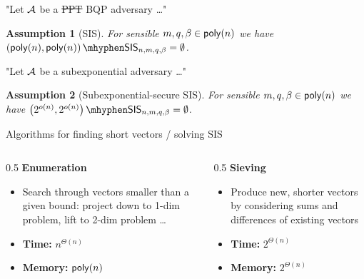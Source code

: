 \documentclass[xcolor=table,10pt,aspectratio=169]{beamer}
\newtheorem{assumption}{Assumption}
\newcommand{\SIS}{\ensuremath{\mathsf{SIS}}\xspace}
\begin{document}
\begin{frame}[label={sec:org0f63eb9}]{"Let \(\mathcal{A}\) be a \sout{ PPT }BQP adversary …"}
\begin{assumption}[SIS]
For sensible \(m,q,\beta \in \poly[n]\) we have \(\left(\poly[n],\allowbreak \poly[n]\right)\mhyphen\SIS_{n,m,q,\beta} = \emptyset\).
\label{ass:sis}
\end{assumption}
\end{frame}
\begin{frame}[label={sec:orgce28a80}]{"Let \(\mathcal{A}\) be a subexponential adversary …"}
\begin{assumption}[Subexponential-secure SIS]
For sensible \(m,q,\beta \in \poly[n]\) we have \(\left(2^{o(n)}, 2^{o(n)}\right)\mhyphen\SIS_{n,m,q,\beta} = \emptyset\).
\label{ass:sis-subexponential}
\end{assumption}
\end{frame}
\begin{frame}[label={sec:org311e9dd}]{Algorithms for finding short vectors / solving SIS}
\begin{columns}[t]
\begin{column}{0.5\columnwidth}
\textbf{Enumeration}

\begin{itemize}
\item Search through vectors smaller than a given bound: project down to 1-dim problem, lift to 2-dim problem …
\item \textbf{Time:} \(n^{\Theta(n)}\)
\item \textbf{Memory:} \(\poly[n]\)
\end{itemize}
\end{column}
\begin{column}{0.5\columnwidth}
\textbf{Sieving}

\begin{itemize}
\item Produce new, shorter vectors by considering sums and differences of existing vectors
\item \textbf{Time:} \(2^{\Theta(n)}\)
\item \textbf{Memory:} \(2^{\Theta(n)}\)
\end{itemize}
\end{column}
\end{columns}
\end{frame}
\end{document}
